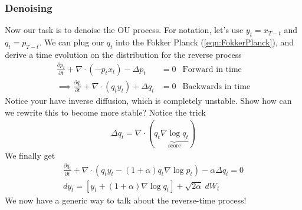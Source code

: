 \subsubsection{Denoising}
Now our task is to denoise the OU process. For notation, let's use $y_t = x_{T-t}$ and $q_t = p_{T-t}$.  We can plug our $q_t$ into the Fokker Planck (\ref{eqn:FokkerPlanck}), and derive a time evolution on the distribution for the reverse process
\begin{align}
	\frac{\partial p_t}{\partial t} + \nabla \cdot (- p_t x_t) - \Delta p_t & = 0 & \text{Forward in time}\\
	\implies  \frac{\partial q_t}{\partial t} + \nabla \cdot (q _t y_t) + \Delta q_t & = 0 & \text{Backwards in time}
\end{align}
Notice your have inverse diffusion, which is completely unstable. Show how can we rewrite this to become more stable? Notice the trick
\begin{align}
	\Delta q_t = \nabla \cdot (q_t \underbrace{\nabla \log q_t}_{\text{score}})
\end{align}
We finally get
\begin{align}
	\frac{\partial q_t}{\partial t} + \nabla \cdot (q_t y_t - (1+\alpha) q_t \nabla\log p_t) - \alpha \Delta q_t = 0\\
	dy_t = [y_t + (1+\alpha) \nabla \log q_t] + \sqrt{2\alpha}~ dW_t
\end{align}
We now have a generic way to talk about the reverse-time process!

